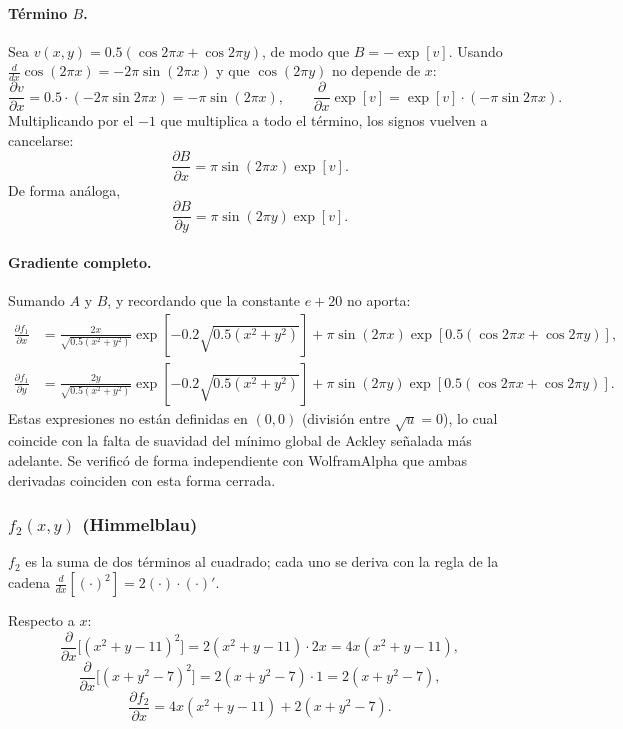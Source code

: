 \paragraph{Término $B$.} Sea $v(x,y)=0.5(\cos 2\pi x+\cos 2\pi y)$, de
modo que $B=-\exp[v]$. Usando $\frac{d}{dx}\cos(2\pi x)=-2\pi\sin(2\pi
x)$ y que $\cos(2\pi y)$ no depende de $x$:
\[
\frac{\partial v}{\partial x} = 0.5\cdot(-2\pi\sin 2\pi x) = -\pi\sin(2\pi x),
\qquad
\frac{\partial}{\partial x}\exp[v] = \exp[v]\cdot(-\pi\sin 2\pi x).
\]
Multiplicando por el $-1$ que multiplica a todo el término, los signos
vuelven a cancelarse:
\[
\frac{\partial B}{\partial x} = \pi\sin(2\pi x)\exp[v].
\]
De forma análoga,
\[
\frac{\partial B}{\partial y} = \pi\sin(2\pi y)\exp[v].
\]

\paragraph{Gradiente completo.} Sumando $A$ y $B$, y recordando que la
constante $e+20$ no aporta:
\begin{align}
\frac{\partial f_1}{\partial x} &= \frac{2x}{\sqrt{0.5(x^2+y^2)}}\exp\!\left[-0.2\sqrt{0.5(x^2+y^2)}\right]
  + \pi\sin(2\pi x)\exp\!\left[0.5(\cos 2\pi x+\cos2\pi y)\right], \\
\frac{\partial f_1}{\partial y} &= \frac{2y}{\sqrt{0.5(x^2+y^2)}}\exp\!\left[-0.2\sqrt{0.5(x^2+y^2)}\right]
  + \pi\sin(2\pi y)\exp\!\left[0.5(\cos 2\pi x+\cos2\pi y)\right].
\end{align}
Estas expresiones no están definidas en $(0,0)$ (división entre
$\sqrt{u}=0$), lo cual coincide con la falta de suavidad del mínimo
global de Ackley señalada más adelante. Se verificó de forma
independiente con WolframAlpha que ambas derivadas coinciden con esta
forma cerrada.

\subsubsection{\texorpdfstring{$f_2(x,y)$}{f2(x, y)} (Himmelblau)}

$f_2$ es la suma de dos términos al cuadrado; cada uno se deriva con la
regla de la cadena $\frac{d}{dx}[(\cdot)^2]=2(\cdot)\cdot(\cdot)'$.

Respecto a $x$:
\[
\frac{\partial}{\partial x}\big[(x^2+y-11)^2\big] = 2(x^2+y-11)\cdot 2x = 4x(x^2+y-11),
\]
\[
\frac{\partial}{\partial x}\big[(x+y^2-7)^2\big] = 2(x+y^2-7)\cdot 1 = 2(x+y^2-7),
\]
\[
\frac{\partial f_2}{\partial x} = 4x(x^2+y-11) + 2(x+y^2-7).
\]

